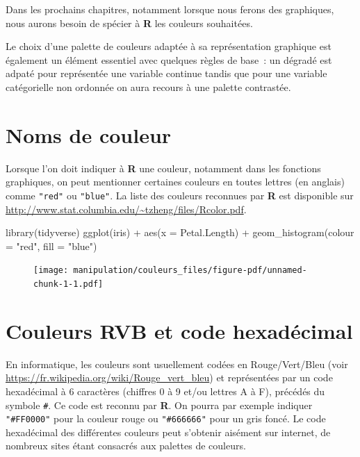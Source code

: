 \documentclass[
  letterpaper,
  DIV=11,
  numbers=noendperiod,
  oneside]{scrreprt}
\newenvironment{Shaded}{\begin{snugshade}}{\end{snugshade}}
\newcommand{\AttributeTok}[1]{\textcolor[rgb]{0.40,0.45,0.13}{#1}}
\newcommand{\FunctionTok}[1]{\textcolor[rgb]{0.28,0.35,0.67}{#1}}
\newcommand{\NormalTok}[1]{\textcolor[rgb]{0.00,0.23,0.31}{#1}}
\newcommand{\SpecialCharTok}[1]{\textcolor[rgb]{0.37,0.37,0.37}{#1}}
\newcommand{\StringTok}[1]{\textcolor[rgb]{0.13,0.47,0.30}{#1}}
\begin{document}
Dans les prochains chapitres, notamment lorsque nous ferons des
graphiques, nous aurons besoin de spécier à \textbf{R} les couleurs
souhaitées.

Le choix d'une palette de couleurs adaptée à sa représentation graphique
est également un élément essentiel avec quelques règles de base~: un
dégradé est adpaté pour représentée une variable continue tandis que
pour une variable catégorielle non ordonnée on aura recours à une
palette contrastée.

\hypertarget{noms-de-couleur}{%
\section{Noms de couleur}\label{noms-de-couleur}}

Lorsque l'on doit indiquer à \textbf{R} une couleur, notamment dans les
fonctions graphiques, on peut mentionner certaines couleurs en toutes
lettres (en anglais) comme \texttt{"red"} ou \texttt{"blue"}. La liste
des couleurs reconnues par \textbf{R} est disponible sur
\url{http://www.stat.columbia.edu/~tzheng/files/Rcolor.pdf}.

\begin{Shaded}
\begin{Highlighting}[]
\FunctionTok{library}\NormalTok{(tidyverse)}
\FunctionTok{ggplot}\NormalTok{(iris) }\SpecialCharTok{+}
  \FunctionTok{aes}\NormalTok{(}\AttributeTok{x =}\NormalTok{ Petal.Length) }\SpecialCharTok{+}
  \FunctionTok{geom\_histogram}\NormalTok{(}\AttributeTok{colour =} \StringTok{"red"}\NormalTok{, }\AttributeTok{fill =} \StringTok{"blue"}\NormalTok{) }
\end{Highlighting}
\end{Shaded}

\begin{figure}[H]

{\centering \texttt{[image: manipulation/couleurs\_files/figure-pdf/unnamed-chunk-1-1.pdf]}

}

\end{figure}

\hypertarget{couleurs-rvb-et-code-hexaduxe9cimal}{%
\section{Couleurs RVB et code
hexadécimal}\label{couleurs-rvb-et-code-hexaduxe9cimal}}

En informatique, les couleurs sont usuellement codées en Rouge/Vert/Bleu
(voir \url{https://fr.wikipedia.org/wiki/Rouge_vert_bleu}) et
représentées par un code hexadécimal à 6 caractères (chiffres 0 à 9
et/ou lettres A à F), précédés du symbole \texttt{\#}. Ce code est
reconnu par \textbf{R}. On pourra par exemple indiquer
\texttt{"\#FF0000"} pour la couleur rouge ou \texttt{"\#666666"} pour un
gris foncé. Le code hexadécimal des différentes couleurs peut s'obtenir
aisément sur internet, de nombreux sites étant consacrés aux palettes de
couleurs.
\end{document}
